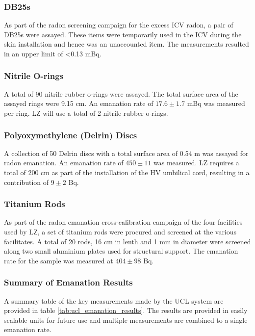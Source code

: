 \subsubsection{DB25s}

As part of the radon screening campaign for the excess ICV radon, a pair of DB25s were assayed. These items were temporarily used in the ICV during the skin installation and hence was an unaccounted item. The measurements resulted in an upper limit of <0.13 mBq.

\subsubsection{Nitrile O-rings}

A total of 90 nitrile rubber o-rings were assayed. The total surface area of the assayed rings were 9.15 cm\squared{}. An emanation rate of $17.6\pm1.7$ mBq was measured per ring. LZ will use a total of 2 nitrile rubber o-rings. 

\subsubsection{Polyoxymethylene (Delrin) Discs}

A collection of 50 Delrin discs with a total surface area of 0.54 m\squared{} was assayed for radon emanation. An emanation rate of $450\pm11$ \uBqms was measured. LZ requires a total of 200 cm\squared{} as part of the installation of the HV umbilical cord, resulting in a contribution of $9\pm2$ \micro{}Bq.


\subsubsection{Titanium Rods}

As part of the radon emanation cross-calibration campaign of the four facilities used by LZ, a set of titanium rods were procured and screened at the various facilitates. A total of 20 rods, 16 cm in lenth and 1 mm in diameter were screened along two small aluminium plates used for structural support. The emanation rate for the sample was measured at $404\pm98$ \micro{}Bq. 


\subsubsection{Summary of Emanation Results}

A summary table of the key measurements made by the UCL system are provided in table \ref{tab:ucl_emanation_results}. The results are provided in easily scalable units for future use and multiple measurements are combined to a single emanation rate. 
%

%



